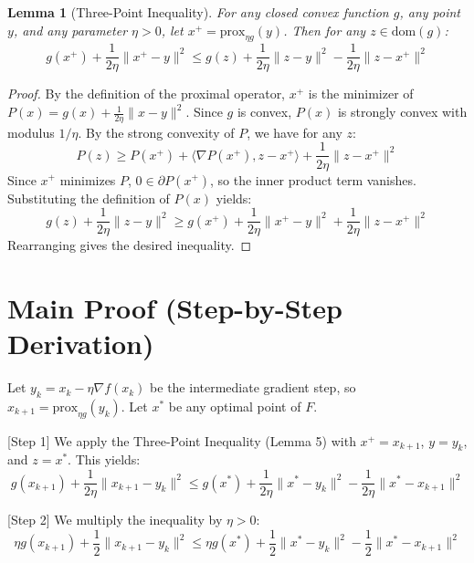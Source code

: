 \documentclass{article}
\newtheorem{lemma}[theorem]{Lemma}
\begin{document}
\begin{lemma}[Three-Point Inequality]
For any closed convex function $g$, any point $y$, and any parameter $\eta > 0$, let $x^+ = \text{prox}_{\eta g}(y)$. Then for any $z \in \text{dom}(g)$:
\begin{equation}
g(x^+) + \frac{1}{2\eta}\|x^+ - y\|^2 \leq g(z) + \frac{1}{2\eta}\|z - y\|^2 - \frac{1}{2\eta}\|z - x^+\|^2
\end{equation}
\end{lemma}
\begin{proof}
By the definition of the proximal operator, $x^+$ is the minimizer of $P(x) = g(x) + \frac{1}{2\eta}\|x - y\|^2$. Since $g$ is convex, $P(x)$ is strongly convex with modulus $1/\eta$. By the strong convexity of $P$, we have for any $z$:
\begin{equation}
P(z) \geq P(x^+) + \langle \nabla P(x^+), z - x^+ \rangle + \frac{1}{2\eta}\|z - x^+\|^2
\end{equation}
Since $x^+$ minimizes $P$, $0 \in \partial P(x^+)$, so the inner product term vanishes. Substituting the definition of $P(x)$ yields:
\begin{equation}
g(z) + \frac{1}{2\eta}\|z - y\|^2 \geq g(x^+) + \frac{1}{2\eta}\|x^+ - y\|^2 + \frac{1}{2\eta}\|z - x^+\|^2
\end{equation}
Rearranging gives the desired inequality.
\end{proof}

\section*{Main Proof (Step-by-Step Derivation)}
Let $y_k = x_k - \eta \nabla f(x_k)$ be the intermediate gradient step, so $x_{k+1} = \text{prox}_{\eta g}(y_k)$. Let $x^*$ be any optimal point of $F$.

[Step 1] We apply the Three-Point Inequality (Lemma 5) with $x^+ = x_{k+1}$, $y = y_k$, and $z = x^*$. This yields:
\begin{equation}
g(x_{k+1}) + \frac{1}{2\eta}\|x_{k+1} - y_k\|^2 \leq g(x^*) + \frac{1}{2\eta}\|x^* - y_k\|^2 - \frac{1}{2\eta}\|x^* - x_{k+1}\|^2
\end{equation}

[Step 2] We multiply the inequality by $\eta > 0$:
\begin{equation}
\eta g(x_{k+1}) + \frac{1}{2}\|x_{k+1} - y_k\|^2 \leq \eta g(x^*) + \frac{1}{2}\|x^* - y_k\|^2 - \frac{1}{2}\|x^* - x_{k+1}\|^2
\end{equation}
\end{document}
